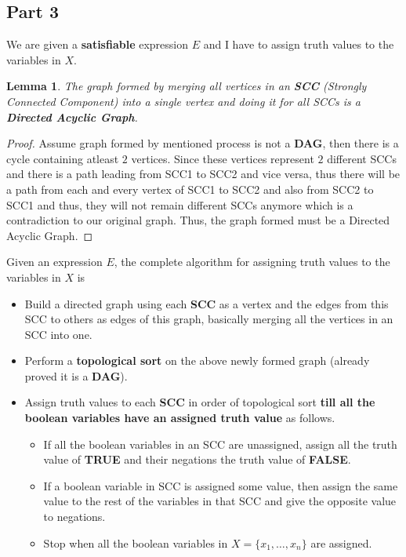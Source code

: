 \documentclass{article}
\let\bold\textbf
\newtheorem{lemma}{Lemma}[section]
\begin{document}
{  \subsection{Part 3}{
    We are given a \bold{satisfiable} expression $E$ and I have to assign truth values to the variables in $X$.
    \begin{lemma}
      The graph formed by merging all vertices in an \bold{SCC} (Strongly Connected Component) into a single vertex and doing it for all SCCs is a \bold{Directed Acyclic Graph}.
    \end{lemma}
    \begin{proof}
      Assume graph formed by mentioned process is not a \bold{DAG}, then there is a cycle containing atleast $2$ vertices. \newline
      Since these vertices represent $2$ different SCCs and there is a path leading from SCC1 to SCC2 and vice versa, thus there will be a path from each and every vertex of SCC1 to SCC2 and also from SCC2 to SCC1 and thus, they will not remain different SCCs anymore which is a contradiction to our original graph. \newline
      Thus, the graph formed must be a Directed Acyclic Graph.
    \end{proof}
    \noindent Given an expression $E$, the complete algorithm for assigning truth values to the variables in $X$ is
    \begin{itemize}
      \item{Build a directed graph using each \bold{SCC} as a vertex and the edges from this SCC to others as edges of this graph, basically merging all the vertices in an SCC into one.}
      \item{Perform a \bold{topological sort} on the above newly formed graph (already proved it is a \bold{DAG}).}
      \item{Assign truth values to each \bold{SCC} in order of topological sort \bold{till all the boolean variables have an assigned truth value} as follows.}
        \begin{itemize}
          \item{If all the boolean variables in an SCC are unassigned, assign all the truth value of \bold{TRUE} and their negations the truth value of \bold{FALSE}.}
          \item{If a boolean variable in SCC is assigned some value, then assign the same value to the rest of the variables in that SCC and give the opposite value to negations.}
          \item{Stop when all the boolean variables in $X=\{x_1,\dots,x_n\}$ are assigned.}

\end{itemize}
\end{itemize}}}
\end{document}

